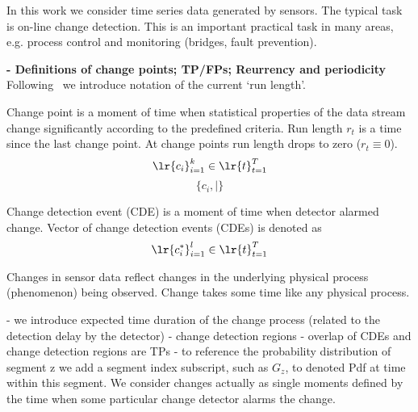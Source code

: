 In this work we consider time series data generated by sensors.
The typical task is on-line change detection.
This is an important practical task in many areas, e.g. process control and monitoring (bridges, fault prevention).

\noindent
\textbf{- Definitions of change points; TP/FPs; Reurrency and periodicity}\\
Following~\cite{mackay2007} we introduce notation of the current `run length'.
\begin{definition}
	Change point is a moment of time when statistical properties of the data stream change significantly according to the predefined criteria.
    Run length $r_t$ is a time since the last change point.
    At change points run length drops to zero ($r_t \equiv 0 $).
    \begin{equation}
        \lr{c_i}_{i=1}^k \in \lr{t}_{t=1}^T
    \end{equation}
    \[
        \{ c_i,  | \}
    \]
\end{definition}
\begin{definition}
    Change detection event (CDE) is a moment of time when detector alarmed change.
    Vector of change detection events (CDEs) is denoted as
    \[
    \lr{c^\ast_i}_{i=1}^{l} \in \lr{t}_{t=1}^T
    \]
\end{definition}
Changes in sensor data reflect changes in the underlying physical process (phenomenon) being observed.
Change takes some time like any physical process.

\begin{figure}
\end{figure}  

- we introduce expected time duration of the change process (related to the detection delay by the detector)
- change detection regions 
- overlap of CDEs and change detection regions are TPs
- to reference the probability distribution of segment z we add a segment index subscript, such as $G_z$, to denoted Pdf at time within this segment.
We consider changes actually as single moments defined by the time when some particular change detector alarms the change.

